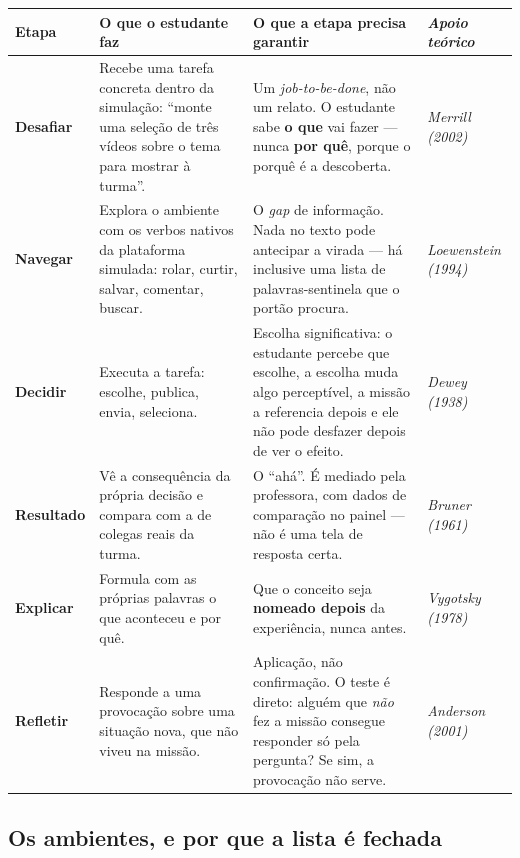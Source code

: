 \documentclass[11pt,a4paper]{article}
\begin{document}
\begin{center}
\begin{tabularx}{\textwidth}{>{\sffamily\bfseries\footnotesize\color{unNavy}}p{2.0cm}>{\footnotesize}p{4.3cm}X>{\footnotesize\itshape}p{2.6cm}}
\toprule
\sffamily\bfseries\footnotesize\color{unNavy}Etapa & \sffamily\bfseries\footnotesize\color{unNavy}O que o estudante faz & \sffamily\bfseries\footnotesize\color{unNavy}O que a etapa precisa garantir & \sffamily\normalfont\bfseries\footnotesize\color{unNavy}Apoio teórico \\
\midrule
Desafiar & Recebe uma tarefa concreta dentro da simulação: ``monte uma seleção de três vídeos sobre o tema para mostrar à turma''. & Um \emph{job-to-be-done}, não um relato. O estudante sabe \textbf{o que} vai fazer --- nunca \textbf{por quê}, porque o porquê é a descoberta. & Merrill (2002) \\
\addlinespace
Navegar & Explora o ambiente com os verbos nativos da plataforma simulada: rolar, curtir, salvar, comentar, buscar. & O \emph{gap} de informação. Nada no texto pode antecipar a virada --- há inclusive uma lista de palavras-sentinela que o portão procura. & Loewenstein (1994) \\
\addlinespace
Decidir & Executa a tarefa: escolhe, publica, envia, seleciona. & Escolha significativa: o estudante percebe que escolhe, a escolha muda algo perceptível, a missão a referencia depois e ele não pode desfazer depois de ver o efeito. & Dewey (1938) \\
\addlinespace
Resultado & Vê a consequência da própria decisão e compara com a de colegas reais da turma. & O ``ahá''. É mediado pela professora, com dados de comparação no painel --- não é uma tela de resposta certa. & Bruner (1961) \\
\addlinespace
Explicar & Formula com as próprias palavras o que aconteceu e por quê. & Que o conceito seja \textbf{nomeado depois} da experiência, nunca antes. & Vygotsky (1978) \\
\addlinespace
Refletir & Responde a uma provocação sobre uma situação nova, que não viveu na missão. & Aplicação, não confirmação. O teste é direto: alguém que \emph{não} fez a missão consegue responder só pela pergunta? Se sim, a provocação não serve. & Anderson (2001) \\
\bottomrule
\end{tabularx}
\end{center}

\subsection{Os ambientes, e por que a lista é fechada}
\end{document}
